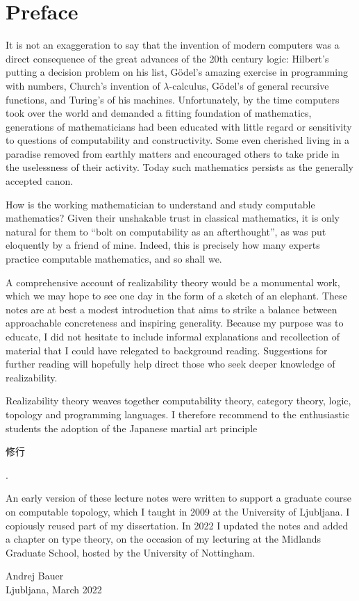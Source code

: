 \chapter*{Preface}

It is not an exaggeration to say that the invention of modern computers was a direct consequence of the great advances of the 20th century logic: Hilbert's putting a decision problem on his list, Gödel's amazing exercise in programming with numbers, Church's invention of $\lambda$-calculus, Gödel's of general recursive functions, and Turing's of his machines.
%
Unfortunately, by the time computers took over the world and demanded a fitting foundation of mathematics,
generations of mathematicians had been educated with little regard or sensitivity to questions of computability and constructivity.
%
Some even cherished living in a paradise removed from earthly matters and encouraged others to take pride in the uselessness of their activity.
%
Today such mathematics persists as the generally accepted canon.

How is the working mathematician to understand and study computable mathematics?
%
Given their unshakable trust in classical mathematics, it is only natural for them to ``bolt on computability as an afterthought'', as was put eloquently by a friend of mine.
%
Indeed, this is precisely how many experts practice computable mathematics, and so shall we.

A comprehensive account of realizability theory would be a monumental work, which we may hope to see one day in the form of a sketch of an elephant. These notes are at best a modest introduction that aims to strike a balance between approachable concreteness and inspiring generality. Because my purpose was to educate, I did not hesitate to include informal explanations and recollection of material that I could have relegated to background reading. Suggestions for further reading will hopefully help direct those who seek deeper knowledge of realizability.

Realizability theory weaves together computability theory, category theory, logic, topology and programming languages. I therefore recommend to the enthusiastic students the adoption of the Japanese martial art principle \begin{CJK}{UTF8}{min}修行\end{CJK}.

An early version of these lecture notes were written to support a graduate course on computable topology, which I taught in 2009 at the University of Ljubljana. I copiously reused part of my dissertation. In 2022 I updated the notes and added a chapter on type theory, on the occasion of my lecturing at the Midlands Graduate School, hosted by the University of Nottingham.



\bigskip

\begin{flushright}
Andrej Bauer\\
Ljubljana, March 2022
\end{flushright}

